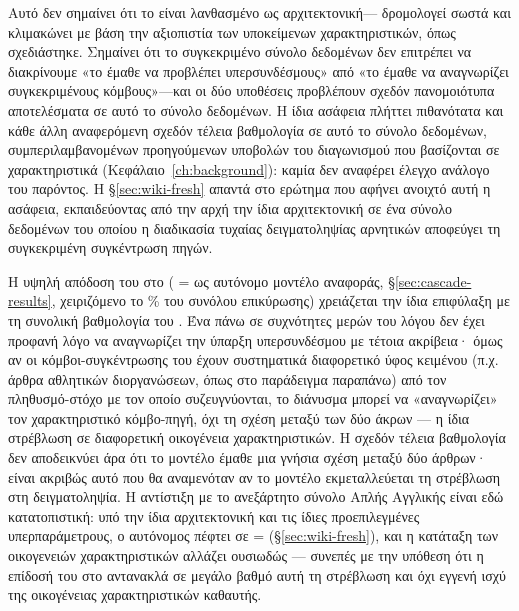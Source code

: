 Αυτό δεν σημαίνει ότι το  είναι λανθασμένο ως αρχιτεκτονική---
δρομολογεί σωστά και κλιμακώνει με βάση την αξιοπιστία των υποκείμενων
χαρακτηριστικών, όπως σχεδιάστηκε.
Σημαίνει ότι το συγκεκριμένο σύνολο
δεδομένων  δεν επιτρέπει να διακρίνουμε «το 
έμαθε να προβλέπει υπερσυνδέσμους» από «το  έμαθε να αναγνωρίζει
\HubCount{} συγκεκριμένους κόμβους»---και οι δύο υποθέσεις προβλέπουν σχεδόν
πανομοιότυπα αποτελέσματα σε αυτό το σύνολο δεδομένων.
Η ίδια ασάφεια πλήττει
πιθανότατα και κάθε άλλη αναφερόμενη σχεδόν τέλεια βαθμολογία σε αυτό το
σύνολο δεδομένων, συμπεριλαμβανομένων προηγούμενων υποβολών του διαγωνισμού
που βασίζονται σε χαρακτηριστικά  (Κεφάλαιο~\ref{ch:background}): καμία
δεν αναφέρει έλεγχο ανάλογο του παρόντος.
Η \S\ref{sec:wiki-fresh} απαντά στο
ερώτημα που αφήνει ανοιχτό αυτή η ασάφεια, εκπαιδεύοντας από την αρχή την ίδια
αρχιτεκτονική  σε ένα σύνολο δεδομένων του οποίου η διαδικασία τυχαίας
δειγματοληψίας αρνητικών αποφεύγει τη συγκεκριμένη συγκέντρωση πηγών.

Η υψηλή απόδοση του \texttt{} στο 
( = \TierTwoFone{} ως αυτόνομο μοντέλο αναφοράς,
\S\ref{sec:cascade-results}, χειριζόμενο το \TierTwoPct\% του συνόλου
επικύρωσης) χρειάζεται την ίδια επιφύλαξη με τη συνολική βαθμολογία του
.
Ένα  πάνω σε συχνότητες μερών του λόγου δεν
έχει προφανή λόγο να αναγνωρίζει την ύπαρξη υπερσυνδέσμου με τέτοια ακρίβεια·
όμως αν οι κόμβοι-συγκέντρωσης του \texttt{} έχουν συστηματικά
διαφορετικό ύφος κειμένου (π.χ. άρθρα αθλητικών διοργανώσεων, όπως στο
παράδειγμα  παραπάνω) από τον
πληθυσμό-στόχο με τον οποίο συζευγνύονται, το διάνυσμα  μπορεί να
«αναγνωρίζει» τον χαρακτηριστικό κόμβο-πηγή, όχι τη σχέση μεταξύ των δύο
άκρων --- η ίδια στρέβλωση σε διαφορετική οικογένεια
χαρακτηριστικών.
Η σχεδόν τέλεια βαθμολογία δεν αποδεικνύει άρα ότι το μοντέλο
έμαθε μια γνήσια σχέση μεταξύ δύο άρθρων· είναι ακριβώς αυτό που θα αναμενόταν
αν το μοντέλο εκμεταλλεύεται τη στρέβλωση στη δειγματοληψία.
Η αντίστιξη με το
ανεξάρτητο σύνολο Απλής Αγγλικής  είναι εδώ κατατοπιστική: υπό
την ίδια αρχιτεκτονική και τις ίδιες προεπιλεγμένες υπερπαράμετρους, ο
αυτόνομος \texttt{} πέφτει σε  = \WfPosFone{}
(\S\ref{sec:wiki-fresh}), και η κατάταξη των οικογενειών χαρακτηριστικών
αλλάζει ουσιωδώς --- συνεπές με την υπόθεση ότι η επίδοσή του στο  αντανακλά σε μεγάλο βαθμό αυτή τη στρέβλωση και όχι εγγενή ισχύ της
οικογένειας χαρακτηριστικών  καθαυτής.


